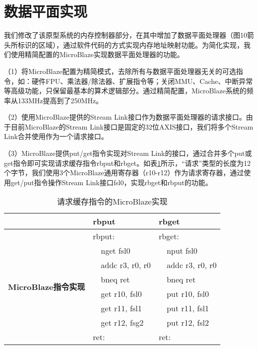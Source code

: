 \section{数据平面实现}

我们修改了该原型系统的内存控制器部分，在其中增加了数据平面处理器（图10箭头所标识的区域），通过软件代码的方式实现内存地址映射功能。为简化实现，我们使用精简配置的MicroBlaze实现数据平面处理器的功能。

（1）将MicroBlaze配置为精简模式，去除所有与数据平面处理器无关的可选指令，如：硬件FPU、乘法器/除法器、扩展指令等；关闭MMU、Cache、中断异常等高级功能，只保留最基本的算术逻辑部分。通过精简配置，MicroBlaze系统的频率从133MHz提高到了250MHz。

（2）使用MicroBlaze提供的Stream Link接口作为数据平面处理器的请求接口。由于目前MicroBlaze的Stream Link接口是固定的32位AXIS接口，我们将多个Stream Link合并使用作为一个请求接口。

（3）MicroBlaze提供put/get指令实现对Stream Link的接口，通过合并多个put或get指令即可实现请求缓存指令rbput和rbget。如表\ref{tab:pard-dp-isa-impl}所示，``请求''类型的长度为12个字节，我们使用3个MicroBlaze通用寄存器（r10-r12）作为请求寄存器，通过使用get/put指令操作Stream Link接口fsl0，实现rbget和rbput的功能。

\begin{table}[htb]
  \centering
  \begin{minipage}[t]{0.6\linewidth}
  \caption{请求缓存指令的MicroBlaze实现}
  \label{tab:pard-dp-isa-impl}
    \begin{tabular*}{\linewidth}{lp{0.5cm}lp{0.5cm}l}
      \toprule[1.5pt]
       & \multicolumn{2}{l}{\textbf{rbput}} & \multicolumn{2}{l}{\textbf{rbget}} \\ 
      \midrule[1pt]

      \multirow{8}{2cm}{\textbf{MicroBlaze指令实现}} & \multicolumn{2}{l}{rbput:}   & \multicolumn{2}{l}{rbget:} \\
                                                   &  & nget fsl0                 &  & nput fsl0               \\
                                                   &  & addc r3, r0, r0           &  & addc r3, r0, r0         \\
                                                   &  & bneq ret                  &  & bneq ret                \\
                                                   &  & get r10, fsl0             &  & put r10, fsl0           \\
                                                   &  & get r11, fsl1             &  & put r11, fsl1           \\
                                                   &  & get r12, fsg2             &  & put r12, fsl2           \\
                                                   & \multicolumn{2}{l}{ret:}     & \multicolumn{2}{l}{ret:}   \\
      \bottomrule[1.5pt]
    \end{tabular*}\\[2pt]
  \end{minipage}
\end{table}


